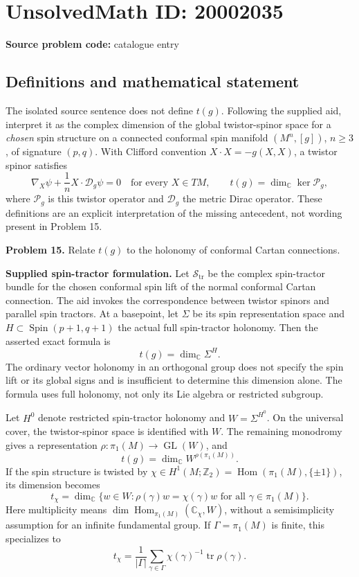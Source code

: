 \documentclass[11pt]{article}
\newcommand{\Z}{\mathbb{Z}}
\newcommand{\C}{\mathbb{C}}
\begin{document}
\section*{UnsolvedMath ID: 20002035}
\textbf{Source problem code:} catalogue entry
\subsection{Definitions and mathematical statement}
The isolated source sentence does not define $t(g)$. Following the supplied aid, interpret it as the complex dimension of the global twistor-spinor space for a \emph{chosen} spin structure on a connected conformal spin manifold $(M^n,[g])$, $n\ge3$, of signature $(p,q)$. With Clifford convention $X\cdot X=-g(X,X)$, a twistor spinor satisfies
\[
 \nabla_X\psi+\frac1nX\cdot\mathcal D_g\psi=0
 \quad\text{for every }X\in TM,
 \qquad t(g)=\dim_\C\ker\mathcal P_g,
\]
where $\mathcal P_g$ is this twistor operator and $\mathcal D_g$ the metric Dirac operator. These definitions are an explicit interpretation of the missing antecedent, not wording present in Problem 15.

\textbf{Problem 15.} Relate $t(g)$ to the holonomy of conformal Cartan connections.

\textbf{Supplied spin-tractor formulation.} Let $\mathcal S_{\mathrm{tr}}$ be the complex spin-tractor bundle for the chosen conformal spin lift of the normal conformal Cartan connection. The aid invokes the correspondence between twistor spinors and parallel spin tractors. At a basepoint, let $\Sigma$ be its spin representation space and $H\subset\operatorname{Spin}(p+1,q+1)$ the actual full spin-tractor holonomy. Then the asserted exact formula is
\[
 t(g)=\dim_\C\Sigma^H.
\]
The ordinary vector holonomy in an orthogonal group does not specify the spin lift or its global signs and is insufficient to determine this dimension alone. The formula uses full holonomy, not only its Lie algebra or restricted subgroup.

Let $H^0$ denote restricted spin-tractor holonomy and $W=\Sigma^{H^0}$. On the universal cover, the twistor-spinor space is identified with $W$. The remaining monodromy gives a representation $\rho:\pi_1(M)\to\operatorname{GL}(W)$, and
\[
 t(g)=\dim_\C W^{\rho(\pi_1(M))}.
\]
If the spin structure is twisted by $\chi\in H^1(M;\Z_2)=\operatorname{Hom}(\pi_1(M),\{\pm1\})$, its dimension becomes
\[
 t_\chi=\dim_\C\{w\in W:\rho(\gamma)w=\chi(\gamma)w
                                  \text{ for all }\gamma\in\pi_1(M)\}.
\]
Here multiplicity means $\dim\operatorname{Hom}_{\pi_1(M)}(\C_\chi,W)$, without a semisimplicity assumption for an infinite fundamental group. If $\Gamma=\pi_1(M)$ is finite, this specializes to
\[
 t_\chi=\frac1{|\Gamma|}\sum_{\gamma\in\Gamma}
                      \chi(\gamma)^{-1}\operatorname{tr}\rho(\gamma).
\]
\end{document}
